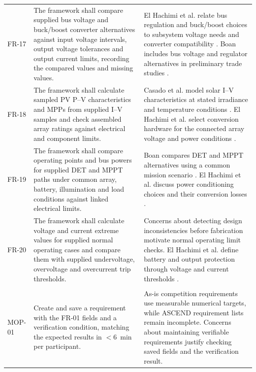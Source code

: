 \begin{longtable}{@{}P{0.13\ReportTableBodyWidth}P{0.45\ReportTableBodyWidth}P{0.42\ReportTableBodyWidth}@{}}
\addlinespace[3pt]
FR-17 & The framework shall compare supplied bus voltage and buck/boost converter alternatives against input voltage intervals, output voltage tolerances and output current limits, recording the compared values and missing values. & El Hachimi et al. relate bus regulation and buck/boost choices to subsystem voltage needs and converter compatibility \citep[Secs.~4 and~7.1]{handpicked-0003}. Boan includes bus voltage and regulator alternatives in preliminary trade studies \citep[Sec.~4]{review-0289}. \\
\addlinespace[3pt]
FR-18 & The framework shall calculate sampled PV P--V characteristics and MPPs from supplied I--V samples and check assembled array ratings against electrical and component limits. & Casado et al. model solar I--V characteristics at stated irradiance and temperature conditions \citep[Sec.~2.1]{review-0573}. El Hachimi et al. select conversion hardware for the connected array voltage and power conditions \citep[Sec.~7.1]{handpicked-0003}. \\
\addlinespace[3pt]
FR-19 & The framework shall compare operating points and bus powers for supplied DET and MPPT paths under common array, battery, illumination and load conditions against linked electrical limits. & Boan compares DET and MPPT alternatives using a common mission scenario \citep[Sec.~3]{review-0289}. El Hachimi et al. discuss power conditioning choices and their conversion losses \citep[Sec.~4]{handpicked-0003}. \\
\addlinespace[3pt]
FR-20 & The framework shall calculate voltage and current extreme values for supplied normal operating cases and compare them with supplied undervoltage, overvoltage and overcurrent trip thresholds. & Concerns about detecting design inconsistencies before fabrication motivate normal operating limit checks. El Hachimi et al. define battery and output protection through voltage and current thresholds \citep[Secs.~7.4--7.5]{handpicked-0003}. \\
\addlinespace[6pt]
 \\*
\midrule
MOP-01 & Create and save a requirement with the FR-01 fields and a verification condition, matching the expected results in $<6$~min per participant. & As-is competition requirements use measurable numerical targets, while ASCEND requirement lists remain incomplete. Concerns about maintaining verifiable requirements justify checking saved fields and the verification result. \\

\end{longtable}

